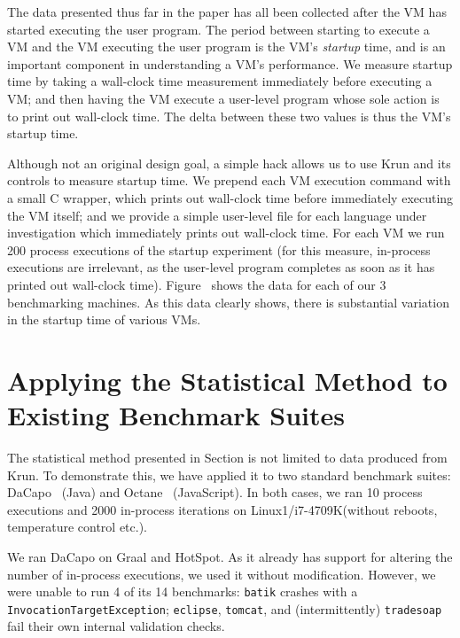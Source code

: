\documentclass[preprint,numbers,10pt]{sigplanconf}
\newcommand{\krun}{Krun\xspace}
\newcommand{\bencherthree}{Linux1/i7-4709K\xspace}
\begin{document}
The data presented thus far in the paper has all been collected after the VM has
started executing the user program. The period between starting to execute a VM
and the VM executing the user program is the VM's \emph{startup} time, and is an
important component in understanding a VM's performance. We measure startup time
by taking a wall-clock time measurement immediately before executing a VM; and
then having the VM execute a user-level program whose sole action is to print
out wall-clock time. The delta between these two values is thus the VM's startup
time.

Although not an original design goal, a simple hack allows us to use \krun and
its controls to measure startup time. We prepend each VM execution command with
a small C wrapper, which prints out wall-clock time before immediately executing
the VM itself; and we provide a simple user-level file for each language under
investigation which immediately prints out wall-clock time. For each VM we run
200 process executions of the startup experiment (for this measure, in-process
executions are irrelevant, as the user-level program completes as soon as it has
printed out wall-clock time). Figure~ shows the data for each of our
3 benchmarking machines. As this data clearly shows, there is substantial
variation in the startup time of various VMs.


\section{Applying the Statistical Method to Existing Benchmark Suites}
\label{sec:existing}

The statistical method presented in Section  is not limited to data
produced from Krun. To demonstrate this, we have applied it to two standard
benchmark suites: DaCapo~\cite{dacapo06} (Java) and Octane~
(JavaScript). In both cases, we ran 10 process executions and 2000 in-process
iterations on \bencherthree (without reboots, temperature control etc.).

We ran DaCapo on Graal and HotSpot. As it already has support for
altering the number of in-process executions, we used it without modification.
However, we were unable to run 4 of its 14 benchmarks: \texttt{batik}
crashes with a \texttt{InvocationTargetException}; \texttt{eclipse},
\texttt{tomcat}, and (intermittently) \texttt{tradesoap} fail their own internal
validation checks.
\end{document}
